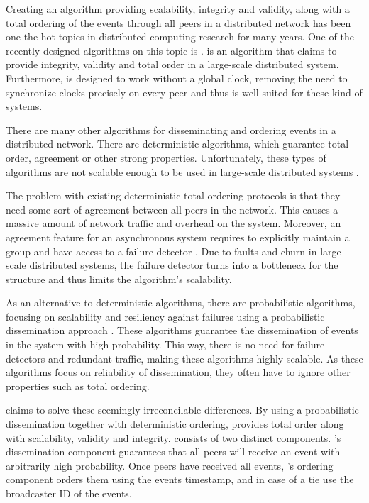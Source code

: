 Creating an algorithm providing scalability, integrity and validity, along with a total ordering of the events through all peers in a distributed network has been one the hot topics in distributed computing research for many years. One of the recently designed algorithms on this topic is \epto \autocite{matos2015epto}. \epto is an algorithm that claims to provide integrity, validity and total order in a large-scale distributed system. Furthermore, \epto is designed to work without a global clock, removing the need to synchronize clocks precisely on every peer and thus is well-suited for these kind of systems.
\par 
There are many other algorithms for disseminating and ordering events in a distributed network. There are deterministic algorithms, which guarantee total order, agreement or other strong properties. Unfortunately, these types of algorithms are not scalable enough to be used in large-scale distributed systems \autocites[]{defago2004total}[]{lamport1978time}.
\par
The problem with existing deterministic total ordering protocols is that they need some sort of agreement between all peers in the network. This causes a massive amount of network traffic and overhead on the system.
Moreover, an agreement feature for an asynchronous system requires to
explicitly maintain a group and have access to a failure detector \autocites[]{chandra1996weakest}[]{chandra1996unreliable}. Due to faults and churn in large-scale distributed systems, the failure detector turns into a bottleneck for the structure and thus limits the algorithm's scalability.
\par
As an alternative to deterministic algorithms, there are probabilistic algorithms, focusing on scalability and resiliency against failures using a probabilistic dissemination approach  \autocite{birman1999bimodal,carvalho2007emergent,demers1987epidemic,eugster2003lightweight,felber2002probabilistic,hayden1996probabilistic,kim2004gossip,Koldehofe02simplegossiping}. These algorithms guarantee the dissemination of events in the system with high probability. This way, there is no need for failure detectors and redundant traffic, making these algorithms highly scalable. As these algorithms focus on reliability of dissemination, they often have to ignore other properties such as total ordering.
\par
\epto claims to solve these seemingly irreconcilable differences. By using a probabilistic dissemination together with deterministic ordering, \epto provides total order along with scalability, validity and integrity. \epto consists of two distinct components. \epto's dissemination component guarantees that all peers will receive an event with arbitrarily high probability. Once peers have received all events, \epto's ordering component orders them using the events timestamp, and in case of a tie use the broadcaster ID of the events.
